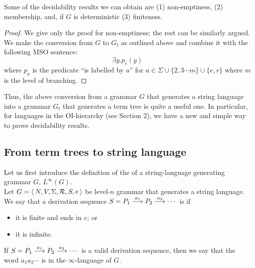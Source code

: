 \begin{proposition}
Some of the decidability results we can obtain are (1)
non-emptiness, (2) membership, and, if $G$ is deterministic (3)
finiteness.
\end{proposition}

\begin{proof} We give only the proof for non-emptiness; the rest can
be similarly argued. We make the conversion from $G$ to $G_t$ as outlined above and
combine it with the following MSO sentence:
\begin{equation}
\nonumber \exists y . p_{e}(y)
\end{equation}
where $p_{a}$ is the predicate ``is labelled by $a$'' for $a \in
\Sigma \cup \{2,3 \cdots m\} \cup \{e, r\}$ where $m$ is the level
of branching.
\end{proof}

Thus, the above conversion from a grammar $G$ that generates a
string language into a grammar $G_t$ that generates a term tree is
quite a useful one. In particular, for languages in the OI-hierarchy (see Section 2), we have a new and simple way to prove
decidability results.

\subsection{From term trees to string language}

Let us first introduce the definition of the
 of
a string-language generating grammar $G$, ${L^\infty}(G)$.\\

Let $G = \langle\,{N, V, \Sigma, {\cal R}, S, e}\,\rangle$ be level-$n$
grammar that generates a string language. We say that a derivation sequence $S
= P_1 \stackrel{{a_1}}{\longrightarrow} P_2 \stackrel{{a_2}}{\longrightarrow} \cdots$ is  if
\begin{itemize}
\item it is finite and ends in $e$; or \item it is infinite.
\end{itemize}

If $S = P_1 \stackrel{{a_1}}{\longrightarrow} P_2 \stackrel{{a_2}}{\longrightarrow} \cdots$ is a valid
derivation sequence, then we say that the word $a_1a_2 \cdots$ is
in the $\infty$-language of $G$.


